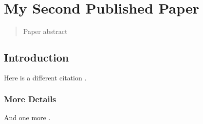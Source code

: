 \chapter{My Second Published Paper}

\begin{quote}
Paper abstract
\end{quote}


\section{Introduction}
Here is a different citation .  

\subsection{More Details}

And one more .



